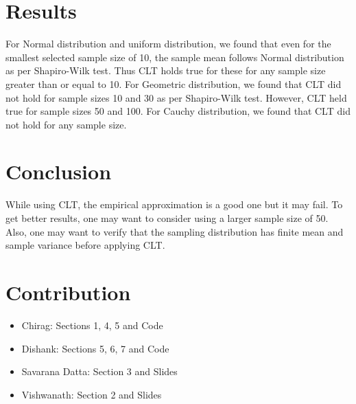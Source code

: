 \documentclass{article}
\begin{document}
\section{Results}
For Normal distribution and uniform distribution, we found that even for the smallest selected sample size of 10, the sample mean follows Normal distribution as per Shapiro-Wilk test. Thus CLT holds true for these for any sample size greater than or equal to 10. For Geometric distribution, we found that CLT did not hold for sample sizes 10 and 30 as per Shapiro-Wilk test. However, CLT held true for sample sizes 50 and 100. For Cauchy distribution, we found that CLT did not hold for any sample size. 

\section{Conclusion}
While using CLT, the empirical approximation is a good one but it may fail. To get better results, one may want to consider using a larger sample size of 50. Also, one may want to verify that the sampling distribution has finite mean and sample variance before applying CLT.

\section{Contribution}
\begin{itemize}
    \item Chirag: Sections 1, 4, 5 and Code
    \item Dishank: Sections 5, 6, 7 and Code
    \item Savarana Datta: Section 3 and Slides
    \item Vishwanath: Section 2 and Slides
\end{itemize}
\end{document}
